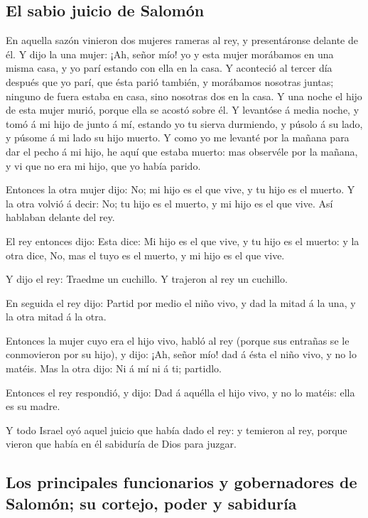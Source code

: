 \hypertarget{el-sabio-juicio-de-salomuxf3n}{%
\subsection{El sabio juicio de
Salomón}\label{el-sabio-juicio-de-salomuxf3n}}

 En aquella sazón vinieron dos mujeres rameras al rey, y
presentáronse delante de él.  Y dijo la una mujer: ¡Ah,
señor mío! yo y esta mujer morábamos en una misma casa, y yo parí
estando con ella en la casa.  Y aconteció al tercer día
después que yo parí, que ésta parió también, y morábamos nosotras
juntas; ninguno de fuera estaba en casa, sino nosotras dos en la casa.
 Y una noche el hijo de esta mujer murió, porque ella se
acostó sobre él.  Y levantóse á media noche, y tomó á mi
hijo de junto á mí, estando yo tu sierva durmiendo, y púsolo á su lado,
y púsome á mi lado su hijo muerto.  Y como yo me levanté
por la mañana para dar el pecho á mi hijo, he aquí que estaba muerto:
mas observéle por la mañana, y vi que no era mi hijo, que yo había
parido.

 Entonces la otra mujer dijo: No; mi hijo es el que vive, y
tu hijo es el muerto. Y la otra volvió á decir: No; tu hijo es el
muerto, y mi hijo es el que vive. Así hablaban delante del rey.

 El rey entonces dijo: Esta dice: Mi hijo es el que vive, y
tu hijo es el muerto: y la otra dice, No, mas el tuyo es el muerto, y mi
hijo es el que vive.

 Y dijo el rey: Traedme un cuchillo. Y trajeron al rey un
cuchillo.

 En seguida el rey dijo: Partid por medio el niño vivo, y
dad la mitad á la una, y la otra mitad á la otra.

 Entonces la mujer cuyo era el hijo vivo, habló al rey
(porque sus entrañas se le conmovieron por su hijo), y dijo: ¡Ah, señor
mío! dad á ésta el niño vivo, y no lo matéis. Mas la otra dijo: Ni á mí
ni á ti; partidlo.

 Entonces el rey respondió, y dijo: Dad á aquélla el hijo
vivo, y no lo matéis: ella es su madre.

 Y todo Israel oyó aquel juicio que había dado el rey: y
temieron al rey, porque vieron que había en él sabiduría de Dios para
juzgar.

\hypertarget{los-principales-funcionarios-y-gobernadores-de-salomuxf3n-su-cortejo-poder-y-sabiduruxeda}{%
\subsection{Los principales funcionarios y gobernadores de Salomón; su
cortejo, poder y
sabiduría}\label{los-principales-funcionarios-y-gobernadores-de-salomuxf3n-su-cortejo-poder-y-sabiduruxeda}}

